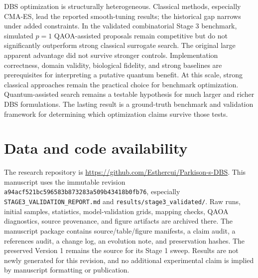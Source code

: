 \documentclass[11pt,letterpaper]{article}
\begin{document}
DBS optimization is structurally heterogeneous. Classical methods, especially CMA-ES, lead the reported smooth-tuning results; the historical gap narrows under added constraints. In the validated combinatorial Stage 3 benchmark, simulated $p=1$ QAOA-assisted proposals remain competitive but do not significantly outperform strong classical surrogate search. The original large apparent advantage did not survive stronger controls. Implementation correctness, domain validity, biological fidelity, and strong baselines are prerequisites for interpreting a putative quantum benefit. At this scale, strong classical approaches remain the practical choice for benchmark optimization. Quantum-assisted search remains a testable hypothesis for much larger and richer DBS formulations. The lasting result is a ground-truth benchmark and validation framework for determining which optimization claims survive those tests.

\section*{Data and code availability}
The research repository is \url{https://github.com/Esthercui/Parkison-s-DBS}. This manuscript uses the immutable revision \nolinkurl{a94acf521bc596583b873283a509b43418b0fb76}, especially \nolinkurl{STAGE3_VALIDATION_REPORT.md} and \nolinkurl{results/stage3_validated/}. Raw runs, initial samples, statistics, model-validation grids, mapping checks, QAOA diagnostics, source provenance, and figure artifacts are archived there. The manuscript package contains source/table/figure manifests, a claim audit, a references audit, a change log, an evolution note, and preservation hashes. The preserved Version 1 remains the source for its Stage 1 sweep. Results are not newly generated for this revision, and no additional experimental claim is implied by manuscript formatting or publication.
\end{document}
